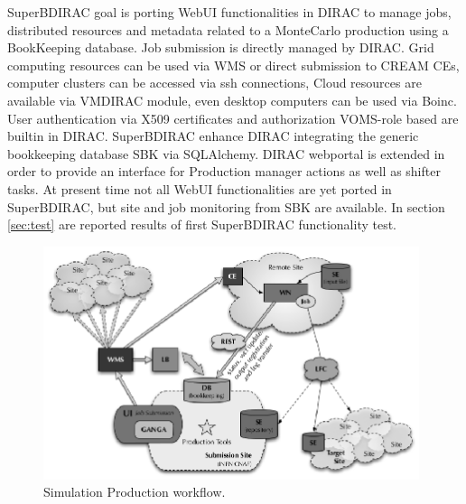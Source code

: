 \documentclass[a4paper]{jpconf}
\begin{document}
SuperBDIRAC goal is porting WebUI functionalities in DIRAC to manage jobs, distributed resources and metadata related to a MonteCarlo production using a BookKeeping database.
Job submission is directly managed by DIRAC. Grid computing resources can be used via WMS or direct submission to CREAM CEs, computer clusters can be accessed via ssh connections, Cloud resources are available via VMDIRAC module, even desktop computers can be used via Boinc. User authentication via X509 certificates and authorization VOMS-role based are builtin in DIRAC.
SuperBDIRAC enhance DIRAC integrating the generic bookkeeping database SBK via SQLAlchemy.
DIRAC webportal is extended in order to provide an interface for Production manager actions as well as shifter tasks.
At present time not all WebUI functionalities are yet ported in SuperBDIRAC, but site and job monitoring from SBK are available.
In section \ref{sec:test} are reported results of first SuperBDIRAC functionality test.


\begin{figure}[h]
\includegraphics[width=26pc]{img/simulation_production_system_workflow.eps}\hspace{2pc}%
\caption{\label{fig:simulation_production_workflow}Simulation Production workflow.}
\end{figure}
 
\end{document}
